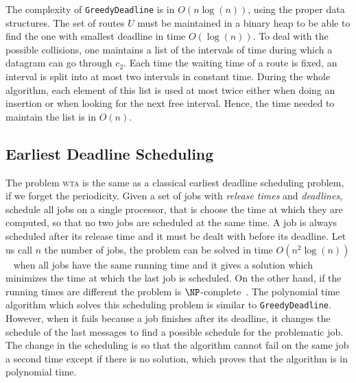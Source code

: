 \documentclass[a4paper,10pt]{article}
\newcommand\greedydeadline{\texttt{GreedyDeadline}\xspace}
\newcommand\wta{\textsc{wta}\xspace}
\begin{document}
      

   


    The complexity of \greedydeadline is in $O(n\log(n))$, using the proper data structures. The set of routes $U$ must be maintained in a binary heap to be able to find the one with smallest deadline in time $O(\log(n))$. To deal with the possible collisions, one maintains a list of the intervals
    of time during which a datagram can go through $c_2$. Each time the waiting time of a route is fixed, an interval is split into at most two intervals in constant time. During the whole algorithm, each element of this list is used at most twice either when doing an insertion or when looking for the next free interval. Hence, the time needed to maintain the list is in $O(n)$. 
  
     \subsection{Earliest Deadline Scheduling}\label{sec:wtaheuristic}
     
     
     The problem \wta is the same as a classical earliest deadline scheduling problem, if we forget the periodicity. Given a set of jobs with \emph{release times} and \emph{deadlines}, schedule all jobs on a single processor, that is choose the time at which they are computed, so that no two jobs are scheduled at the same time. A job is always scheduled after its release time and it must be dealt with before its deadline. Let us call $n$ the number of jobs, the problem can be solved in time $O(n^2\log(n))$~\cite{simons1978fast} when all jobs have the same running time and it gives a solution which minimizes the time at which the last job is scheduled. On the other hand, if the running times are different the problem is $\NP$-complete~\cite{lenstra1977complexity}. 
     The polynomial time algorithm which solves this scheduling problem is similar to \greedydeadline. However, when it fails because a job finishes after its deadline, it changes the schedule of the last messages to find a possible schedule for the problematic job. The change in the scheduling is so that the algorithm cannot fail on the same job a second time except if there is no solution, which proves that the algorithm is in polynomial time.
     
\end{document}

